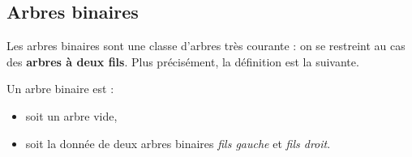 \documentclass{../cours}
\begin{document}
\subsection{Arbres binaires}

Les arbres binaires sont une classe d'arbres très courante : on se restreint au cas des \textbf{arbres à deux fils}.
Plus précisément, la définition est la suivante.

\begin{Definition}
Un arbre binaire est :
\begin{itemize}
\item soit un arbre vide,
\item soit la donnée de deux arbres binaires \emph{fils gauche} et \emph{fils droit}.
\end{itemize}
\end{Definition}
\end{document}
